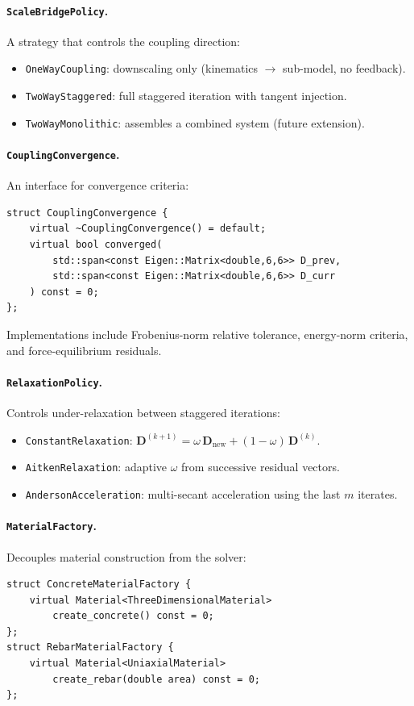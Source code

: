 \paragraph{\texttt{ScaleBridgePolicy}.}
A strategy that controls the coupling direction:
\begin{itemize}
  \item \texttt{OneWayCoupling}: downscaling only
    (kinematics $\to$ sub-model, no feedback).
  \item \texttt{TwoWayStaggered}: full staggered iteration
    with tangent injection.
  \item \texttt{TwoWayMonolithic}: assembles a combined
    system (future extension).
\end{itemize}

\paragraph{\texttt{CouplingConvergence}.}
An interface for convergence criteria:
\begin{lstlisting}[caption={Convergence criterion interface.}]
struct CouplingConvergence {
    virtual ~CouplingConvergence() = default;
    virtual bool converged(
        std::span<const Eigen::Matrix<double,6,6>> D_prev,
        std::span<const Eigen::Matrix<double,6,6>> D_curr
    ) const = 0;
};
\end{lstlisting}
Implementations include Frobenius-norm relative tolerance,
energy-norm criteria, and force-equilibrium residuals.

\paragraph{\texttt{RelaxationPolicy}.}
Controls under-relaxation between staggered iterations:
\begin{itemize}
  \item \texttt{ConstantRelaxation}: $\mathbf{D}^{(k+1)} =
    \omega \, \mathbf{D}_{\text{new}} +
    (1 - \omega) \, \mathbf{D}^{(k)}$.
  \item \texttt{AitkenRelaxation}: adaptive $\omega$ from
    successive residual vectors.
  \item \texttt{AndersonAcceleration}: multi-secant acceleration
    using the last $m$ iterates.
\end{itemize}

\paragraph{\texttt{MaterialFactory}.}
Decouples material construction from the solver:
\begin{lstlisting}[caption={Material factory concept.}]
struct ConcreteMaterialFactory {
    virtual Material<ThreeDimensionalMaterial>
        create_concrete() const = 0;
};
struct RebarMaterialFactory {
    virtual Material<UniaxialMaterial>
        create_rebar(double area) const = 0;
};
\end{lstlisting}

